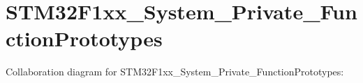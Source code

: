 \hypertarget{group__STM32F1xx__System__Private__FunctionPrototypes}{}\section{S\+T\+M32\+F1xx\+\_\+\+System\+\_\+\+Private\+\_\+\+Function\+Prototypes}
\label{group__STM32F1xx__System__Private__FunctionPrototypes}
Collaboration diagram for S\+T\+M32\+F1xx\+\_\+\+System\+\_\+\+Private\+\_\+\+Function\+Prototypes\+:

